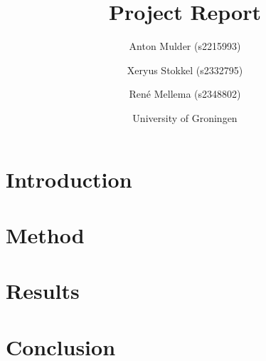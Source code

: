 \documentclass{article}
\title{\textbf{\huge Project Report}}
\author{Anton Mulder (s2215993) \and Xeryus Stokkel (s2332795)  \and Ren\'e Mellema (s2348802)}
\date{University of Groningen}
\begin{document}
\maketitle

\begin{abstract}

\end{abstract}

\section{Introduction}


\section{Method}


\section{Results}


\section{Conclusion}




\end{document}
